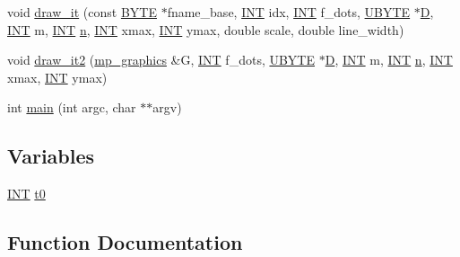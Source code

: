 \begin{DoxyCompactItemize}
\item 
void \mbox{\hyperlink{plot__decomposition__matrix_8_c_a5e87e6a70f1fd027af4fe50285948880}{draw\+\_\+it}} (const \mbox{\hyperlink{galois_8h_ab6cc7b4aeb6ea31aba2b3fbfc83ff5e6}{B\+Y\+TE}} $\ast$fname\+\_\+base, \mbox{\hyperlink{galois_8h_a09fddde158a3a20bd2dcadb609de11dc}{I\+NT}} idx, \mbox{\hyperlink{galois_8h_a09fddde158a3a20bd2dcadb609de11dc}{I\+NT}} f\+\_\+dots, \mbox{\hyperlink{galois_8h_a122c4acf389c050379f00341fdcd5812}{U\+B\+Y\+TE}} $\ast$\mbox{\hyperlink{costas_8_c_af13967e8da5ae214c112fd612639beaa}{D}}, \mbox{\hyperlink{galois_8h_a09fddde158a3a20bd2dcadb609de11dc}{I\+NT}} m, \mbox{\hyperlink{galois_8h_a09fddde158a3a20bd2dcadb609de11dc}{I\+NT}} \mbox{\hyperlink{simeon_8_c_a7f2cd26777ce0ff3fdaf8d02aacbddfb}{n}}, \mbox{\hyperlink{galois_8h_a09fddde158a3a20bd2dcadb609de11dc}{I\+NT}} xmax, \mbox{\hyperlink{galois_8h_a09fddde158a3a20bd2dcadb609de11dc}{I\+NT}} ymax, double scale, double line\+\_\+width)
\item 
void \mbox{\hyperlink{plot__decomposition__matrix_8_c_ac1625003fdeabc86385385f169bd3e21}{draw\+\_\+it2}} (\mbox{\hyperlink{classmp__graphics}{mp\+\_\+graphics}} \&G, \mbox{\hyperlink{galois_8h_a09fddde158a3a20bd2dcadb609de11dc}{I\+NT}} f\+\_\+dots, \mbox{\hyperlink{galois_8h_a122c4acf389c050379f00341fdcd5812}{U\+B\+Y\+TE}} $\ast$\mbox{\hyperlink{costas_8_c_af13967e8da5ae214c112fd612639beaa}{D}}, \mbox{\hyperlink{galois_8h_a09fddde158a3a20bd2dcadb609de11dc}{I\+NT}} m, \mbox{\hyperlink{galois_8h_a09fddde158a3a20bd2dcadb609de11dc}{I\+NT}} \mbox{\hyperlink{simeon_8_c_a7f2cd26777ce0ff3fdaf8d02aacbddfb}{n}}, \mbox{\hyperlink{galois_8h_a09fddde158a3a20bd2dcadb609de11dc}{I\+NT}} xmax, \mbox{\hyperlink{galois_8h_a09fddde158a3a20bd2dcadb609de11dc}{I\+NT}} ymax)
\item 
int \mbox{\hyperlink{plot__decomposition__matrix_8_c_a3c04138a5bfe5d72780bb7e82a18e627}{main}} (int argc, char $\ast$$\ast$argv)
\end{DoxyCompactItemize}
\subsection*{Variables}
\begin{DoxyCompactItemize}
\item 
\mbox{\hyperlink{galois_8h_a09fddde158a3a20bd2dcadb609de11dc}{I\+NT}} \mbox{\hyperlink{plot__decomposition__matrix_8_c_a4268f4fe222ffb119218a0199f5e1904}{t0}}
\end{DoxyCompactItemize}


\subsection{Function Documentation}
\mbox{\label{plot__decomposition__matrix_8_c_a5e87e6a70f1fd027af4fe50285948880}} 

